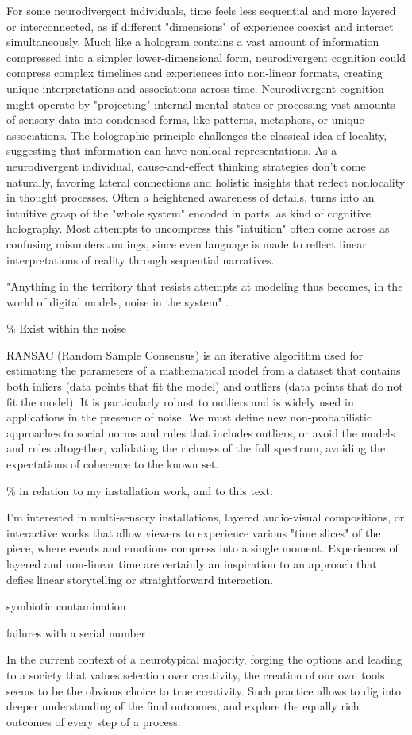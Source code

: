 For some neurodivergent individuals, time feels less sequential and more layered or interconnected, as if different "dimensions" of experience coexist and interact simultaneously. Much like a hologram contains a vast amount of information compressed into a simpler lower-dimensional form, neurodivergent cognition could compress complex timelines and experiences into non-linear formats, creating unique interpretations and associations across time.
Neurodivergent cognition might operate by "projecting" internal mental states or processing vast amounts of sensory data into condensed forms, like patterns, metaphors, or unique associations. The holographic principle challenges the classical idea of locality, suggesting that information can have nonlocal representations. As a neurodivergent individual, cause-and-effect thinking strategies don't come naturally, favoring lateral connections and holistic insights that reflect nonlocality in thought processes. Often a heightened awareness of details, turns into an intuitive grasp of the "whole system" encoded in parts, as kind of cognitive holography. Most attempts to uncompress this "intuition" often come across as confusing misunderstandings, since even language is made to reflect linear interpretations of reality through sequential narratives.

"Anything in the territory that resists attempts at modeling thus becomes, in the world of digital models, noise in the system" \citep{benasayag2019}.


{\scriptsize \textcolor{comment}{\%  Exist within the noise }}

RANSAC (Random Sample Consensus) is an iterative algorithm used for estimating the parameters of a mathematical model from a dataset that contains both inliers (data points that fit the model) and outliers (data points that do not fit the model). It is particularly robust to outliers and is widely used in applications in the presence of noise. We must define new non-probabilistic approaches to social norms and rules that includes outliers, or avoid the models and rules altogether, validating the richness of the full spectrum, avoiding the expectations of coherence to the known set. 

{\scriptsize \textcolor{comment}{\%  in relation to my installation work, and to this text:}}

I'm interested in multi-sensory installations, layered audio-visual compositions, or interactive works that allow viewers to experience various "time slices" of the piece, where events and emotions compress into a single moment. Experiences of layered and non-linear time are certainly an inspiration to an approach that defies linear storytelling or straightforward interaction.

symbiotic contamination

failures with a serial number

In the current context of a neurotypical majority, forging the options and leading to a society that values selection over creativity, the creation of our own tools seems to be the obvious choice to true creativity. Such practice allows to dig into deeper understanding of the final outcomes, and explore the equally rich outcomes of every step of a process.   

